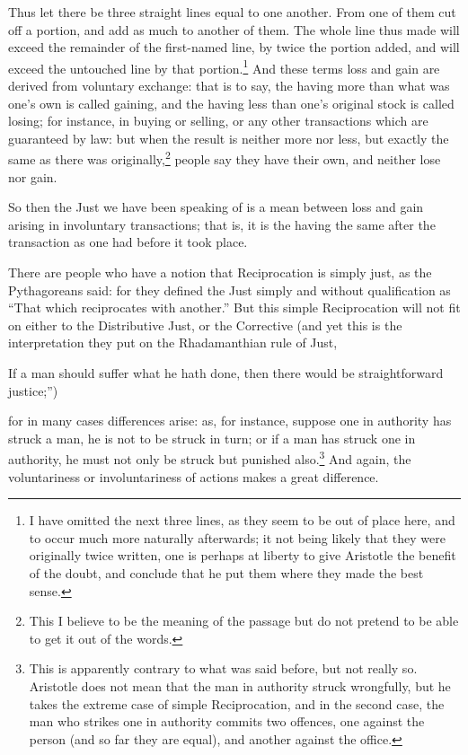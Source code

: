 Thus let there be three straight lines equal to one another. From one of them
cut off a portion, and add as much to another of them. The whole line thus made
will exceed the remainder of the first-named line, by twice the portion added,
and will exceed the untouched line by that portion.\footnote{I have omitted the next three lines, as they seem to be out of place here, and
to occur much more naturally afterwards; it not being likely that they were
originally twice written, one is perhaps at liberty to give Aristotle the
benefit of the doubt, and conclude that he put them where they made the best
sense.}
And these terms loss and gain are derived from voluntary exchange: that is to
say, the having more than what was one’s own is called gaining, and the
having less than one’s original stock is called losing; for instance, in
buying or selling, or any other transactions which are guaranteed by law: but
when the result is neither more nor less, but exactly the same as there was
originally,\footnote{This I believe to be the meaning of the passage but do not pretend to be able
to get it out of the words.}
people say they have their own, and neither lose nor gain.

So then the Just we have been speaking of is a mean between loss and gain
arising in involuntary transactions; that is, it is the having the same after
the transaction as one had before it took place.


There are people who have a notion that Reciprocation is simply just, as the
Pythagoreans said: for they defined the Just simply and without qualification
as “That which reciprocates with another.” But this simple
Reciprocation will not fit on either to the Distributive Just, or the
Corrective (and yet this is the interpretation they put on the Rhadamanthian
rule of Just,

If a man should suffer what he hath done, then there would be straightforward
justice;”)

for in many cases differences arise: as, for instance, suppose one in authority
has struck a man, he is not to be struck in turn; or if a man has struck one in
authority, he must not only be struck but punished also.\footnote{This is apparently contrary to what was said before, but not really so.
Aristotle does not mean that the man in authority struck wrongfully, but he
takes the extreme case of simple Reciprocation, and in the second case, the man
who strikes one in authority commits two offences, one against the person (and
so far they are equal), and another against the office.}
And again, the voluntariness or involuntariness of actions makes a great
difference.

